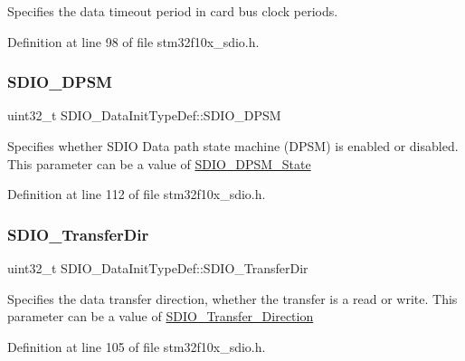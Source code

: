 Specifies the data timeout period in card bus clock periods. 

Definition at line 98 of file stm32f10x\+\_\+sdio.\+h.

\mbox{\label{struct_s_d_i_o___data_init_type_def_ad5eb5f3c6fd9e5d4a6664c5cf57d6b03}} 
\subsubsection{\texorpdfstring{S\+D\+I\+O\+\_\+\+D\+P\+SM}{SDIO\_DPSM}}
{\footnotesize\ttfamily uint32\+\_\+t S\+D\+I\+O\+\_\+\+Data\+Init\+Type\+Def\+::\+S\+D\+I\+O\+\_\+\+D\+P\+SM}

Specifies whether S\+D\+IO Data path state machine (D\+P\+SM) is enabled or disabled. This parameter can be a value of \hyperlink{group___s_d_i_o___d_p_s_m___state}{S\+D\+I\+O\+\_\+\+D\+P\+S\+M\+\_\+\+State} 

Definition at line 112 of file stm32f10x\+\_\+sdio.\+h.

\mbox{\label{struct_s_d_i_o___data_init_type_def_a4838fffdb3f87850569dff12f15485db}} 
\subsubsection{\texorpdfstring{S\+D\+I\+O\+\_\+\+Transfer\+Dir}{SDIO\_TransferDir}}
{\footnotesize\ttfamily uint32\+\_\+t S\+D\+I\+O\+\_\+\+Data\+Init\+Type\+Def\+::\+S\+D\+I\+O\+\_\+\+Transfer\+Dir}

Specifies the data transfer direction, whether the transfer is a read or write. This parameter can be a value of \hyperlink{group___s_d_i_o___transfer___direction}{S\+D\+I\+O\+\_\+\+Transfer\+\_\+\+Direction} 

Definition at line 105 of file stm32f10x\+\_\+sdio.\+h.

